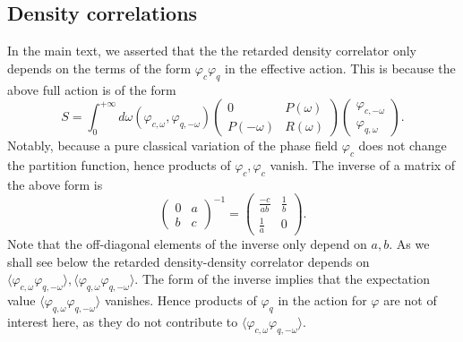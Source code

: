\documentclass[twocolumn,floatfix,superscriptaddress]{revtex4-1}
\newcommand{\ket}{\rangle}
\newcommand{\bra}{\langle}
\begin{document}
\begin{widetext}
\subsection{Density correlations}
\label{sec:density-correlations}

In the main text, we asserted that the the retarded density correlator
only depends on the terms of the form $\varphi_c\varphi_q$ in the
effective action.  This is because the above full action is of the form
\[ S=\int_0^{+\infty} d\omega (\varphi_{c,\omega},\varphi_{q,-\omega})\left(\begin{array}{cc} 0& P(\omega) \\ P(-\omega)& R(\omega)\end{array}\right) \left(\begin{array}{c}\varphi_{c,-\omega}\\ \varphi_{q,\omega}\end{array}\right).\]
Notably, because a pure classical variation of the phase field
$\varphi_c$ does not change the partition function, hence products of
$\varphi_c,\varphi_c$ vanish. The inverse of a  matrix of the above
form is
\[\left(\begin{array}{cc} 0& a\\b &c\end{array}\right)^{-1}=\left(\begin{array}{cc}\frac{-c}{ab}& \frac{1}{b}\\ \frac{1}{a} & 0\end{array}\right) .\] 
Note that the off-diagonal elements of the inverse only depend on
$a,b$. As we shall see below the retarded density-density correlator
depends on $\bra \varphi_{c,\omega}\varphi_{q,-\omega}\ket,\bra
\varphi_{q,\omega}\varphi_{q,-\omega}\ket$.  The form of the inverse
implies that the expectation value $\bra
\varphi_{q,\omega}\varphi_{q,-\omega}\ket$ vanishes. Hence products of
$\varphi_q$ in the action for $\varphi$ are not of interest here, as
they do not contribute to $\bra \varphi_{c,\omega}\varphi_{q,-\omega}\ket$.


\end{widetext}
\end{document}
